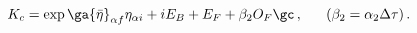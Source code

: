 \begin{equation}
K_c=\exp\ga {\bar\eta}_{\alpha f}{\eta}_{\alpha
i}+iE_B+E_F+\beta_2 O_F
 \gc\,,~~~~~(\beta_2=\alpha_2\Delta\tau)\,.
\end{equation}

